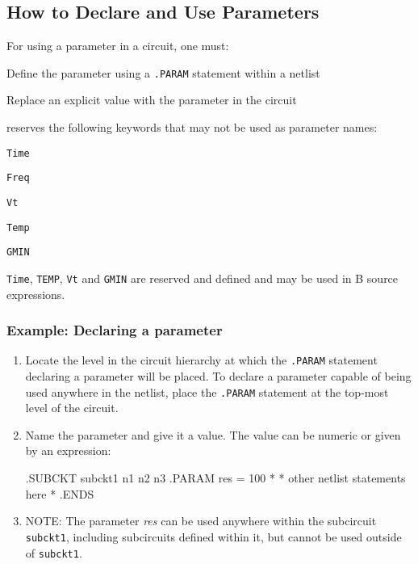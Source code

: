 \subsection{How to Declare and Use Parameters}

For using a parameter in a circuit, one must:
\begin{XyceItemize}
\item Define the parameter using a \verb+.PARAM+ statement within a netlist
\item Replace an explicit value with the parameter in the circuit
\end{XyceItemize}
 \Xyce{} reserves the following keywords that may not be used as parameter names:
\begin{XyceItemize}
\item \verb+Time+
\item \verb+Freq+ 
\item \verb+Vt+
\item \verb+Temp+
\item \verb+GMIN+
\end{XyceItemize}

\texttt{Time}, \texttt{TEMP}, \texttt{Vt} and \texttt{GMIN} are
reserved and defined and may be used in B source expressions.

\subsubsection{Example:  Declaring a parameter}
\begin{enumerate}
\item Locate the level in the circuit hierarchy at which the \verb+.PARAM+
  statement declaring a parameter will be placed. To declare a parameter capable of being used anywhere in the netlist, place the \verb+.PARAM+ statement at the top-most level of the circuit.
\item Name the parameter and give it a value. The value can be numeric or given
  by an expression:
  \begin{vquote}
.SUBCKT subckt1 n1 n2 n3
.PARAM res = 100
*
* other netlist statements here
*
.ENDS
\end{vquote}
\item NOTE: The parameter \emph{res} can be used anywhere within the subcircuit
  \texttt{subckt1}, including subcircuits defined within it, but cannot be used outside
  of \texttt{subckt1}.
\end{enumerate}

